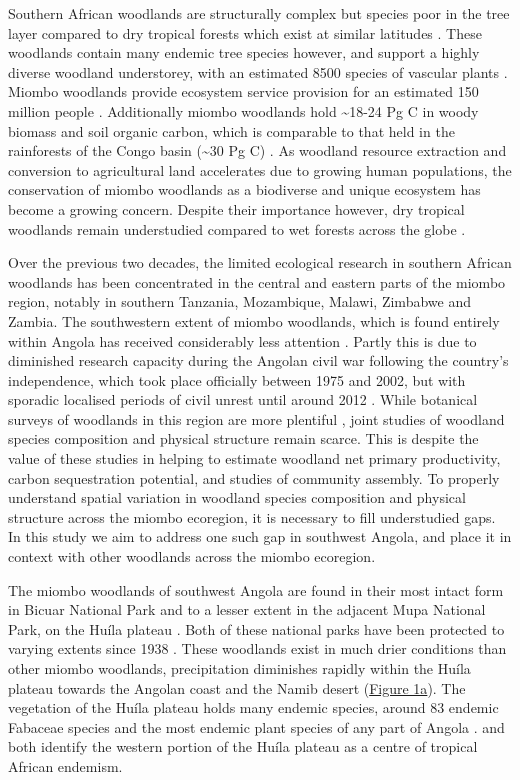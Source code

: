 \documentclass[diversity,article,submit,moreauthors,pdftex]{Definitions/mdpi}
\begin{document}
Southern African woodlands are structurally complex but species poor in the tree layer compared to dry tropical forests which exist at similar latitudes \citep{DRYFLOR2016, Torello-raventos2013}. These woodlands contain many endemic tree species however, and support a highly diverse woodland understorey, with an estimated 8500 species of vascular plants \citep{Frost1996}. Miombo woodlands provide ecosystem service provision for an estimated 150 million people \citep{Ryan2016}. Additionally miombo woodlands hold \textasciitilde{}18-24 Pg C in woody biomass and soil organic carbon, which is comparable to that held in the rainforests of the Congo basin (\textasciitilde{}30 Pg C) \citep{Mayaux2008}. As woodland resource extraction and conversion to agricultural land accelerates due to growing human populations, the conservation of miombo woodlands as a biodiverse and unique ecosystem has become a growing concern. Despite their importance however, dry tropical woodlands remain understudied compared to wet forests across the globe \citep{Clarke2017}. 

Over the previous two decades, the limited ecological research in southern African woodlands has been concentrated in the central and eastern parts of the miombo region, notably in southern Tanzania, Mozambique, Malawi, Zimbabwe and Zambia. The southwestern extent of miombo woodlands, which is found entirely within Angola has received considerably less attention \citep{Huntley2019}. Partly this is due to diminished research capacity during the Angolan civil war following the country's independence, which took place officially between 1975 and 2002, but with sporadic localised periods of civil unrest until around 2012 \citep{Oliveira2015}. While botanical surveys of woodlands in this region are more plentiful \citep{Huntley2019, Figueiredo2009}, joint studies of woodland species composition and physical structure remain scarce. This is despite the value of these studies in helping to estimate woodland net primary productivity, carbon sequestration potential, and studies of community assembly. To properly understand spatial variation in woodland species composition and physical structure across the miombo ecoregion, it is necessary to fill understudied gaps. In this study we aim to address one such gap in southwest Angola, and place it in context with other woodlands across the miombo ecoregion.

The miombo woodlands of southwest Angola are found in their most intact form in Bicuar National Park and to a lesser extent in the adjacent Mupa National Park, on the Hu\'{i}la plateau \citep{Chisingui2018}. Both of these national parks have been protected to varying extents since 1938 \cite{Huntley2019}. These woodlands exist in much drier conditions than other miombo woodlands, precipitation diminishes rapidly within the Hu\'{i}la plateau towards the Angolan coast and the Namib desert (\hyperref[plot_map]{Figure 1a}). The vegetation of the Hu\'{i}la plateau holds many endemic species, around 83 endemic Fabaceae species \citep{Soares2007} and the most endemic plant species of any part of Angola \citep{Figueiredo2008}. \citet{Linder2001} and \citet{Droissart2018} both identify the western portion of the Hu\'{i}la plateau as a centre of tropical African endemism.
\end{document}
